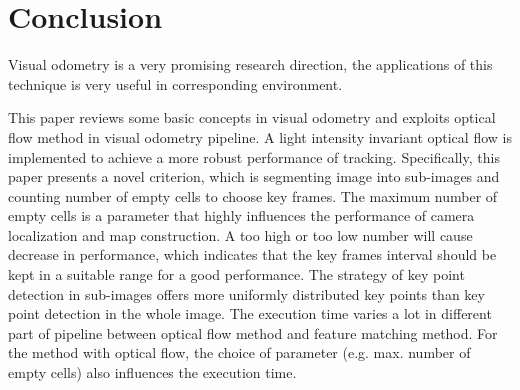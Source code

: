 \documentclass{easychair}
\begin{document}
\section{Conclusion}
Visual odometry is a very promising research direction, the applications of this technique is very useful in corresponding environment.

This paper reviews some basic concepts in visual odometry and exploits optical flow method in visual odometry pipeline. A light intensity invariant optical flow is implemented to achieve a more robust performance of tracking. Specifically, this paper presents a novel criterion, which is segmenting image into sub-images and counting number of empty cells to choose key frames. The maximum number of empty cells is a parameter that highly influences the performance of camera localization and map construction. A too high or too low number will cause decrease in performance, which indicates that the key frames interval should be kept in a suitable range for a good performance. The strategy of key point detection in sub-images offers more uniformly distributed key points than key point detection in the whole image. The execution time varies a lot in different part of pipeline between optical flow method and feature matching method. For the method with optical flow, the choice of parameter (e.g. max. number of empty cells) also influences the execution time.
\end{document}
